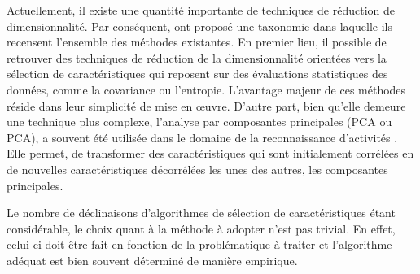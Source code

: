 Actuellement, il existe une quantité importante de techniques de réduction de dimensionnalité. Par conséquent, \cite{VanDerMaaten2009} ont proposé une taxonomie dans laquelle ils recensent l'ensemble des méthodes existantes. En premier lieu, il possible de retrouver des techniques de réduction de la dimensionnalité orientées vers la sélection de caractéristiques qui reposent sur des évaluations statistiques des données, comme la covariance ou l'entropie. L'avantage majeur de ces méthodes réside dans leur simplicité de mise en {\oe}uvre. D'autre part, bien qu'elle demeure une technique plus complexe, l'analyse par composantes principales (\acl{PCA} ou \acs{PCA}), a souvent été utilisée dans le domaine de la reconnaissance d'activités \citep{He2009, Altun2010, Chen2012, Leightley2013}. Elle permet, de transformer des caractéristiques qui sont initialement corrélées en de nouvelles caractéristiques décorrélées les unes des autres, les composantes principales.%

Le nombre de déclinaisons d'algorithmes de sélection de caractéristiques étant considérable, le choix quant à la méthode à adopter n'est pas trivial. En effet, celui-ci doit être fait en fonction de la problématique à traiter et l'algorithme adéquat est bien souvent déterminé de manière empirique. %

